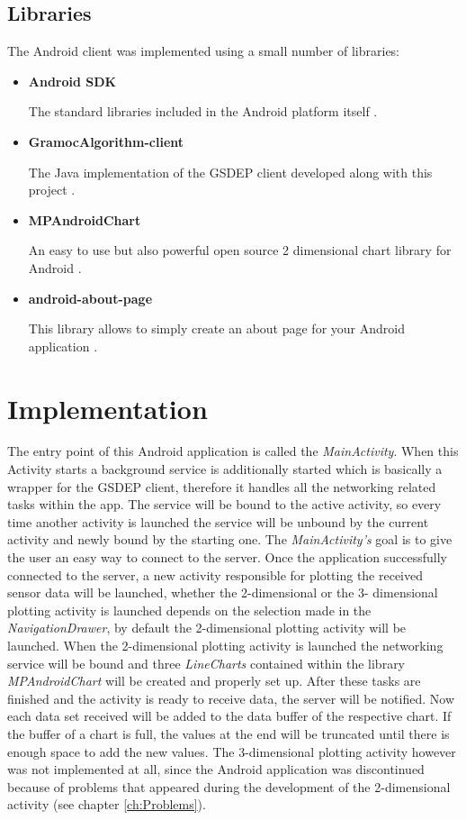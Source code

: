 \subsection{Libraries}
The Android client was implemented using a small number of libraries:
\begin{itemize}
    \item \textbf{Android SDK}

    The standard libraries included in the Android platform itself \autocite{AndroidSDK}.

    \item \textbf{GramocAlgorithm-client}

    The Java implementation of the GSDEP client developed along with this project \autocite{GramocAlgorithm-client}.

    \item \textbf{MPAndroidChart}

    An easy to use but also powerful open source 2 dimensional chart library for Android \autocite{MPAndroidChart}.

    \item \textbf{android-about-page}

    This library allows to simply create an about page for your Android application \autocite{android-about-page}.
\end{itemize}

\section{Implementation}
The entry point of this Android application is called the \emph{MainActivity}. When this Activity starts a background service is additionally started which is basically a wrapper for the GSDEP client, therefore it handles all the networking related tasks within the app. The service will be bound to the active activity, so every time another activity is launched the service will be unbound by the current activity and newly bound by the starting one. The \emph{MainActivity's} goal is to give the user an easy way to connect to the server. Once the application successfully connected to the server, a new activity responsible for plotting the received sensor data will be launched, whether the 2-dimensional or the 3- dimensional plotting activity is launched depends on the selection made in the \emph{NavigationDrawer}, by default the 2-dimensional plotting activity will be launched. When the 2-dimensional plotting activity is launched the networking service will be bound and three \emph{LineCharts} contained within the library \emph{MPAndroidChart} will be created and properly set up. After these tasks are finished and the activity is ready to receive data, the server will be notified. Now each data set received will be added to the data buffer of the respective chart. If the buffer of a chart is full, the values at the end will be truncated until there is enough space to add the new values. The 3-dimensional plotting activity however was not implemented at all, since the Android application was discontinued because of problems that appeared during the development of the 2-dimensional activity (see chapter \vref{ch:Problems}).
